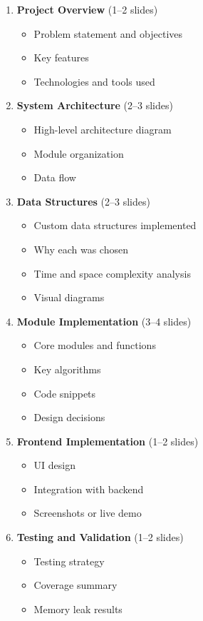 \begin{enumerate}
  \item \textbf{Project Overview} (1--2 slides)
    \begin{itemize}
      \item Problem statement and objectives
      \item Key features
      \item Technologies and tools used
    \end{itemize}

  \item \textbf{System Architecture} (2--3 slides)
    \begin{itemize}
      \item High-level architecture diagram
      \item Module organization
      \item Data flow
    \end{itemize}

  \item \textbf{Data Structures} (2--3 slides)
    \begin{itemize}
      \item Custom data structures implemented
      \item Why each was chosen
      \item Time and space complexity analysis
      \item Visual diagrams
    \end{itemize}

  \item \textbf{Module Implementation} (3--4 slides)
    \begin{itemize}
      \item Core modules and functions
      \item Key algorithms
      \item Code snippets
      \item Design decisions
    \end{itemize}

  \item \textbf{Frontend Implementation} (1--2 slides)
    \begin{itemize}
      \item UI design
      \item Integration with backend
      \item Screenshots or live demo
    \end{itemize}

  \item \textbf{Testing and Validation} (1--2 slides)
    \begin{itemize}
      \item Testing strategy
      \item Coverage summary
      \item Memory leak results
    \end{itemize}


\end{enumerate}
